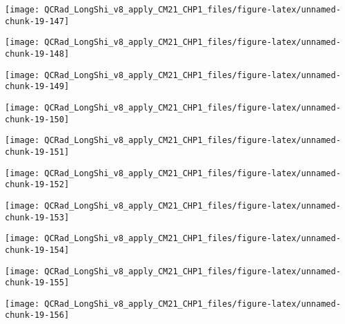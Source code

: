 \documentclass[
  10pt,
  a4paper,oneside]{article}
\begin{document}
\begin{center}\texttt{[image: QCRad\_LongShi\_v8\_apply\_CM21\_CHP1\_files/figure-latex/unnamed-chunk-19-147]} \end{center}

\begin{center}\texttt{[image: QCRad\_LongShi\_v8\_apply\_CM21\_CHP1\_files/figure-latex/unnamed-chunk-19-148]} \end{center}

\begin{center}\texttt{[image: QCRad\_LongShi\_v8\_apply\_CM21\_CHP1\_files/figure-latex/unnamed-chunk-19-149]} \end{center}

\begin{center}\texttt{[image: QCRad\_LongShi\_v8\_apply\_CM21\_CHP1\_files/figure-latex/unnamed-chunk-19-150]} \end{center}

\begin{center}\texttt{[image: QCRad\_LongShi\_v8\_apply\_CM21\_CHP1\_files/figure-latex/unnamed-chunk-19-151]} \end{center}

\begin{center}\texttt{[image: QCRad\_LongShi\_v8\_apply\_CM21\_CHP1\_files/figure-latex/unnamed-chunk-19-152]} \end{center}

\begin{center}\texttt{[image: QCRad\_LongShi\_v8\_apply\_CM21\_CHP1\_files/figure-latex/unnamed-chunk-19-153]} \end{center}

\begin{center}\texttt{[image: QCRad\_LongShi\_v8\_apply\_CM21\_CHP1\_files/figure-latex/unnamed-chunk-19-154]} \end{center}

\begin{center}\texttt{[image: QCRad\_LongShi\_v8\_apply\_CM21\_CHP1\_files/figure-latex/unnamed-chunk-19-155]} \end{center}

\begin{center}\texttt{[image: QCRad\_LongShi\_v8\_apply\_CM21\_CHP1\_files/figure-latex/unnamed-chunk-19-156]} \end{center}
\end{document}
